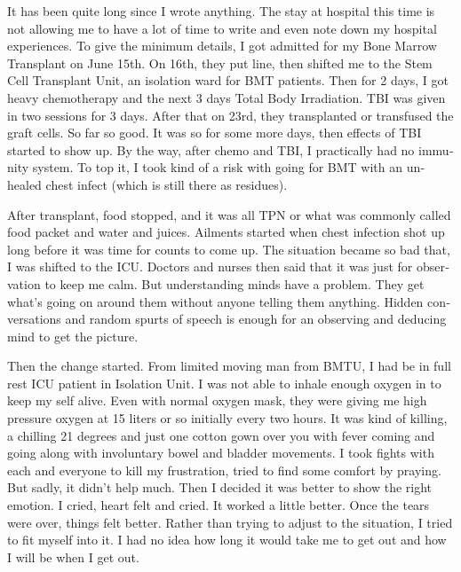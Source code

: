\vskip 2pt
\begin{english}

It has been quite long since I wrote anything. The stay at hospital this time is not allowing me to have a lot of time to write and even note down my hospital experiences. To give the minimum details, I got admitted for my Bone Marrow Transplant on June 15th. On 16th, they put line, then shifted me to the Stem Cell Transplant Unit, an isolation ward for BMT patients. Then for 2 days, I got heavy chemotherapy and the next 3 days Total Body Irradiation. TBI was given in two sessions for 3 days. After that on 23rd, they transplanted or transfused the graft cells. So far so good. It was so for some more days, then effects of TBI started to show up. By the way, after chemo and TBI, I practically had no immunity system. To top it, I took kind of a risk with going for BMT with an unhealed chest infect (which is still there as residues). 

After transplant, food stopped, and it was all TPN or what was commonly called food packet and water and juices. Ailments started when chest infection shot up long before it was time for counts to come up. The situation became so bad that, I was shifted to the ICU. Doctors and nurses then said that it was just for observation to keep me calm. But understanding minds have a problem. They get what's going on around them without anyone telling them anything. Hidden conversations and random spurts of speech is enough for an observing and deducing mind to get the picture. 

Then the change started. From limited moving man from BMTU, I had be in full rest ICU patient in Isolation Unit. I was not able to inhale enough oxygen in to keep my self alive. Even with normal oxygen mask, they were giving me high pressure oxygen at 15 liters or so initially every two hours. It was kind of killing, a chilling 21 degrees and just one cotton gown over you with fever coming and going along with involuntary bowel and bladder movements. I took fights with each and everyone to kill my frustration, tried to find some comfort by praying. But sadly, it didn't help much. Then I decided it was better to show the right emotion. I cried, heart felt and cried. It worked a little better. Once the tears were over, things felt better. Rather than trying to adjust to the situation, I tried to fit myself into it. I had no idea how long it would take me to get out and how I will be when I get out. 


\end{english}
